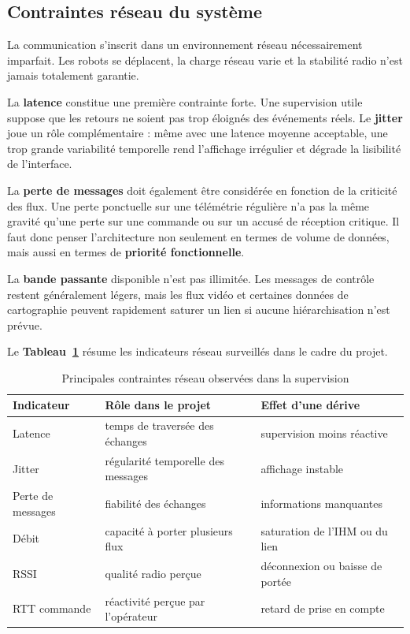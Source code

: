 \documentclass[11pt,a4paper]{report}
\newcommand{\kw}[1]{\textbf{#1}}
\begin{document}
\subsection{Contraintes réseau du système}

La communication s’inscrit dans un environnement réseau nécessairement imparfait. Les robots se déplacent, la charge réseau varie et la stabilité radio n’est jamais totalement garantie.

La \kw{latence} constitue une première contrainte forte. Une supervision utile suppose que les retours ne soient pas trop éloignés des événements réels. Le \kw{jitter} joue un rôle complémentaire : même avec une latence moyenne acceptable, une trop grande variabilité temporelle rend l’affichage irrégulier et dégrade la lisibilité de l’interface.

La \kw{perte de messages} doit également être considérée en fonction de la criticité des flux. Une perte ponctuelle sur une télémétrie régulière n’a pas la même gravité qu’une perte sur une commande ou sur un accusé de réception critique. Il faut donc penser l’architecture non seulement en termes de volume de données, mais aussi en termes de \kw{priorité fonctionnelle}.

La \kw{bande passante} disponible n’est pas illimitée. Les messages de contrôle restent généralement légers, mais les flux vidéo et certaines données de cartographie peuvent rapidement saturer un lien si aucune hiérarchisation n’est prévue.

Le \kw{Tableau~\ref{tab:v2x_qos}} résume les indicateurs réseau surveillés dans le cadre du projet.

\begin{table}[H]
\centering
\small
\renewcommand{\arraystretch}{1.15}
\begin{tabular}{|p{4.1cm}|p{5.2cm}|p{4.0cm}|}
\hline
\textbf{Indicateur} & \textbf{Rôle dans le projet} & \textbf{Effet d’une dérive} \\
\hline
Latence & temps de traversée des échanges & supervision moins réactive \\
\hline
Jitter & régularité temporelle des messages & affichage instable \\
\hline
Perte de messages & fiabilité des échanges & informations manquantes \\
\hline
Débit & capacité à porter plusieurs flux & saturation de l’IHM ou du lien \\
\hline
RSSI & qualité radio perçue & déconnexion ou baisse de portée \\
\hline
RTT commande & réactivité perçue par l’opérateur & retard de prise en compte \\
\hline
\end{tabular}
\caption{Principales contraintes réseau observées dans la supervision}
\label{tab:v2x_qos}
\end{table}
\end{document}
